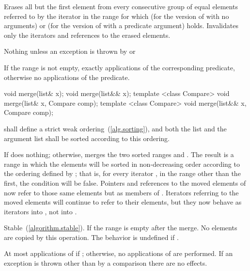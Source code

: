 \begin{itemdescr}
\pnum
\effects
Erases all but the first element from every
consecutive group of equal elements referred to by the iterator  in the range
 for which  (for the version of
 with no arguments) or  (for the version of
 with a predicate argument) holds.
Invalidates only the iterators and references to the erased elements.

\pnum
\throws
Nothing unless an exception is thrown by
or

\pnum
\complexity
If the range
\tcode{[first, last)}
is not empty, exactly
applications of the corresponding predicate,
otherwise no applications of the predicate.
\end{itemdescr}

%
\begin{itemdecl}
void merge(list& x);
void merge(list&& x);
template <class Compare> void merge(list& x, Compare comp);
template <class Compare> void merge(list&& x, Compare comp);
\end{itemdecl}

\begin{itemdescr}
\pnum
\requires
{} shall define a strict weak ordering~(\ref{alg.sorting}), and both the list and the argument list shall be
sorted according to this ordering.

\pnum
\effects
If  does nothing; otherwise, merges the two sorted ranges \tcode{[begin(),
end())} and \tcode{[x.\brk{}begin(), x.end())}. The result is a range in which the elements
will be sorted in non-decreasing order according to the ordering defined by ; that
is, for every iterator , in the range other than the first, the condition
 will be false.
Pointers and references to the moved elements of  now refer to those same elements
but as members of . Iterators referring to the moved elements will continue to
refer to their elements, but they now behave as iterators into , not into
.

\pnum
\remarks Stable~(\ref{algorithm.stable}). If  the range \tcode{[x.begin(), x.end())}
is empty after the merge.
No elements are copied by this operation. The behavior is undefined if
.

\pnum
\complexity
At most
applications of  if
;
otherwise, no applications of  are performed.
If an exception is thrown other than by a comparison there are no effects.
\end{itemdescr}

